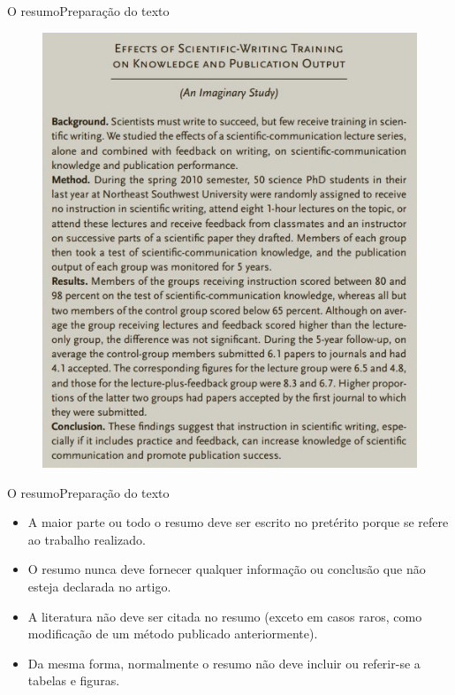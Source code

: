 \documentclass[t]{beamer}
\begin{document}
\begin{ftst}{O resumo}{Preparação do texto}
\justifying
\begin{figure}
    \centering
    \includegraphics[scale=0.5]{Figuras/resumo2.jpg}
\end{figure}

\end{ftst}


\begin{ftst}{O resumo}{Preparação do texto}
\justifying
\begin{itemize}
    \item A maior parte ou todo o resumo deve ser escrito no pretérito porque se refere ao trabalho realizado.
    \vone
    \item O resumo nunca deve fornecer qualquer informação ou conclusão que não esteja declarada no artigo.
    \vone
    \item A literatura não deve ser citada no resumo (exceto em casos raros, como modificação de um método publicado anteriormente).
    \vone
    \item Da mesma forma, normalmente o resumo não deve incluir ou referir-se a tabelas e figuras.
\end{itemize}

\end{ftst}
\end{document}
